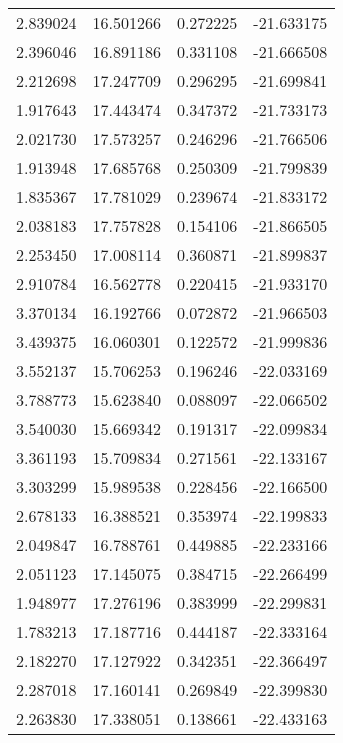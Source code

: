 \begin{tabular}{rrrr}
        2.839024 &        16.501266 &    0.272225 & -21.633175 \\
        2.396046 &        16.891186 &    0.331108 & -21.666508 \\
        2.212698 &        17.247709 &    0.296295 & -21.699841 \\
        1.917643 &        17.443474 &    0.347372 & -21.733173 \\
        2.021730 &        17.573257 &    0.246296 & -21.766506 \\
        1.913948 &        17.685768 &    0.250309 & -21.799839 \\
        1.835367 &        17.781029 &    0.239674 & -21.833172 \\
        2.038183 &        17.757828 &    0.154106 & -21.866505 \\
        2.253450 &        17.008114 &    0.360871 & -21.899837 \\
        2.910784 &        16.562778 &    0.220415 & -21.933170 \\
        3.370134 &        16.192766 &    0.072872 & -21.966503 \\
        3.439375 &        16.060301 &    0.122572 & -21.999836 \\
        3.552137 &        15.706253 &    0.196246 & -22.033169 \\
        3.788773 &        15.623840 &    0.088097 & -22.066502 \\
        3.540030 &        15.669342 &    0.191317 & -22.099834 \\
        3.361193 &        15.709834 &    0.271561 & -22.133167 \\
        3.303299 &        15.989538 &    0.228456 & -22.166500 \\
        2.678133 &        16.388521 &    0.353974 & -22.199833 \\
        2.049847 &        16.788761 &    0.449885 & -22.233166 \\
        2.051123 &        17.145075 &    0.384715 & -22.266499 \\
        1.948977 &        17.276196 &    0.383999 & -22.299831 \\
        1.783213 &        17.187716 &    0.444187 & -22.333164 \\
        2.182270 &        17.127922 &    0.342351 & -22.366497 \\
        2.287018 &        17.160141 &    0.269849 & -22.399830 \\
        2.263830 &        17.338051 &    0.138661 & -22.433163 \\

\end{tabular}
